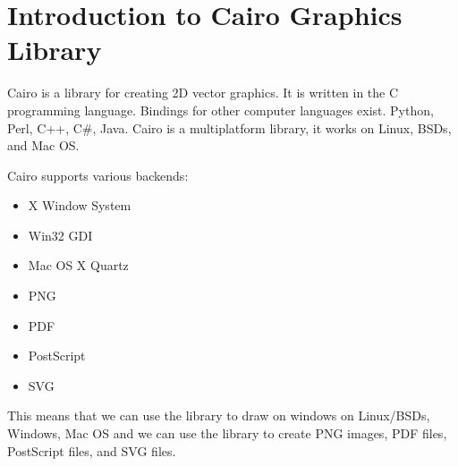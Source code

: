 \newpage
\section{Introduction to Cairo Graphics Library}
Cairo is a library for creating 2D vector graphics. It is written in the C programming language. Bindings for other computer languages exist. Python, Perl, C++, C\#, Java. Cairo is a multiplatform library, it works on Linux, BSDs, and Mac OS.\\

\begin{center}
\end{center}

Cairo supports various backends:
\begin{itemize}
\item X Window System
\item Win32 GDI
\item Mac OS X Quartz
\item PNG
\item PDF
\item PostScript
\item SVG
\end{itemize}

\noindent This means that we can use the library to draw on windows on Linux/BSDs, Windows, Mac OS and we can use the library to create PNG images, PDF files, PostScript files, and SVG files.
